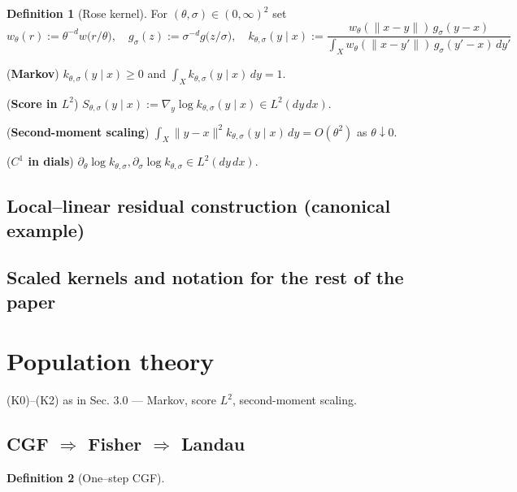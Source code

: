 \documentclass{article}
\theoremstyle{plain}
\theoremstyle{definition}
\newtheorem{definition}{Definition}[section]
\theoremstyle{remark}
\begin{document}
	\begin{definition}[Rose kernel]
		For $(\theta,\sigma)\in(0,\infty)^{2}$ set
		\[
			w_\theta(r):=\theta^{-d}w\!\bigl(r/\theta\bigr),  \quad g_\sigma(z):=\sigma^{-d}g\!\bigl(z/\sigma\bigr), \quad k_{\theta,\sigma}(y\mid x):=  \frac{w_\theta(\|x-y\|)\,g_\sigma(y-x)} {\displaystyle\int_X w_\theta(\|x-y'\|)\,g_\sigma(y'-x)\,dy'} 
		\]
	\end{definition}

	\begin{assumptionlist}[label=(K\arabic*)]
		\item \label{K0} (\textbf{Markov}) $k_{\theta,\sigma}(y\mid x)\ge0$ and $\int_X k_{\theta,\sigma}(y\mid x)\,dy = 1$.

		\item \label{K1} (\textbf{Score in $L^{2}$}) $S_{\theta,\sigma}(y\mid x):=\nabla_y\log k_{\theta,\sigma}(y\mid x) \in L^{2}(dy\,dx)$.
		
		\item \label{K2} (\textbf{Second-moment scaling}) $\displaystyle\int_X\|y-x\|^{2}k_{\theta,\sigma}(y\mid x)\,dy = O(\theta^{2})$ as $\theta\downarrow 0$.

		\item \label{K3} (\textbf{$C^{1}$ in dials}) $\partial_\theta\log k_{\theta,\sigma},  \partial_\sigma\log k_{\theta,\sigma}\in L^{2}(dy\,dx)$.
	\end{assumptionlist}
	
  	\subsection{Local–linear residual construction (canonical example)}
 	\subsection{Scaled kernels and notation for the rest of the paper}

\section{Population theory}
  	\begin{assumptionbox}
    		(K0)–(K2) as in Sec. 3.0 — Markov, score $L^2$, second-moment scaling.
 	 \end{assumptionbox}

  	\subsection{CGF $\Rightarrow$ Fisher $\Rightarrow$ Landau}
		\begin{definition}[One–step CGF]\label{def:CGF}
		\end{definition}
\end{document}
